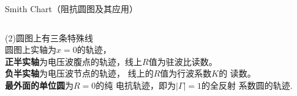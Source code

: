  \begin{frame}{Smith Chart（阻抗圆图及其应用）}
   \begin{columns}
     \begin{column}{0.45\linewidth}
       (2)圆图上有三条特殊线\\
       圆图上实轴为$x=0$的轨迹，\\ \textbf{正半实轴}为电压波腹点的轨迹，线上$R$值为驻波比读数。\\
       \textbf{负半实轴}为电压波节点的轨迹，
       线上的$R$值为行波系数$K$的
       读数。\\
       \textbf{最外面的单位圆}为$R=0$的纯
       电抗轨迹，即为$\lvert\Gamma\rvert=1$的全反射
       系数圆的轨迹.
     \end{column}
     \begin{column}{0.55\linewidth}
     \end{column}
   \end{columns}
 \end{frame}
 
